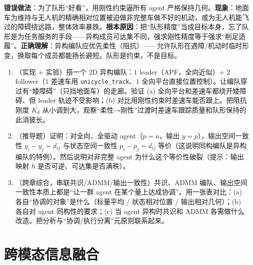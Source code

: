 \begin{pitfall}
\textbf{错误做法}：为了队形“好看”，用刚性约束逼所有 agent 严格保持几何。\textbf{现象}：地面车为维持与无人机的精确相对位置被迫做非完整车做不好的机动，或为无人机能飞过的障碍绕远路，整体效率暴跌。\textbf{根本原因}：把“队形精度”当成目标本身，忘了队形是为任务服务的手段——异构成员可达集不同，强求刚性精度等于强求“削足适履”。\textbf{正确理解}：异构编队应优先柔性（阻抗）——允许队形在遇障/机动时临时形变，换取每个成员都能扬长避短。队形是约束，不是目标。
\end{pitfall}

\begin{practice}
\begin{enumerate}
  \item （实现 $+$ 实验）搭一个 2D 异构编队：$1$ leader（APF，全向近似）$+$ $2$ follower（$1$ 差速车用 \texttt{unicycle\_track}、$1$ 全向平台直接位置控制）。让编队穿过有“矮障碍”（只挡地面车）的走廊。验证 (a) 全向平台和差速车都绕开矮障碍、但 leader 轨迹不受影响；(b) 对比用刚性约束时差速车能否跟上。把阻抗刚度 $K_d$ 从小调到大，观察“柔性→刚性”过渡时差速车跟踪质量和队形保持的此消彼长。
  \item （推导题）证明：对全向、全驱动 agent（$\ddot p=u$，输出 $y=p$），输出空间一致性 $y_i-y_j=d_{ij}$ 与状态空间一致性 $p_i-p_j=d_{ij}$ 等价（这说明同构编队是异构编队的特例）。然后说明对非完整 agent 为什么这个等价性破裂（提示：输出映射 $h$ 是否可逆、可达集是否满秩）。
  \item （跨章综合，串联共识/ADMM/输出一致性）共识、ADMM 编队、输出空间一致性本质上都是“让一群 agent 在某个量上达成协调”。用一张表对比：(a) 各自“协调的对象”是什么（标量平均 / 状态相对位置 / 输出相对几何）；(b) 各自对 agent 同构性的要求；(c) 当 agent 异构时共识和 ADMM 各需做什么改造。把分析与“协调/执行分离”元原则联系起来。
\end{enumerate}
\end{practice}

\section{跨模态信息融合}
\label{sec:hmr-perception}


